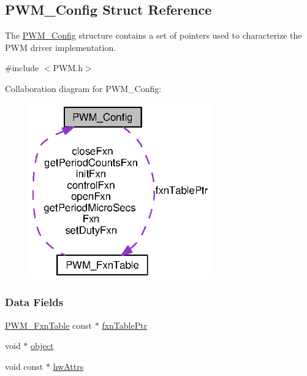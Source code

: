 \subsection{P\-W\-M\-\_\-\-Config Struct Reference}
\label{struct_p_w_m___config}


The \hyperlink{struct_p_w_m___config}{P\-W\-M\-\_\-\-Config} structure contains a set of pointers used to characterize the P\-W\-M driver implementation.  




{\ttfamily \#include $<$P\-W\-M.\-h$>$}



Collaboration diagram for P\-W\-M\-\_\-\-Config\-:
\nopagebreak
\begin{figure}[H]
\begin{center}
\leavevmode
\includegraphics[width=222pt]{struct_p_w_m___config__coll__graph}
\end{center}
\end{figure}
\subsubsection*{Data Fields}
\begin{DoxyCompactItemize}
\item 
\hyperlink{struct_p_w_m___fxn_table}{P\-W\-M\-\_\-\-Fxn\-Table} const $\ast$ \hyperlink{struct_p_w_m___config_ac02604d8e0fafc8b5ff71171a4bf3461}{fxn\-Table\-Ptr}
\item 
void $\ast$ \hyperlink{struct_p_w_m___config_a33c57f0fe6b8af13f7a9c8ec392019a6}{object}
\item 
void const $\ast$ \hyperlink{struct_p_w_m___config_a2299aba19683340f917ca962a9536148}{hw\-Attrs}
\end{DoxyCompactItemize}


